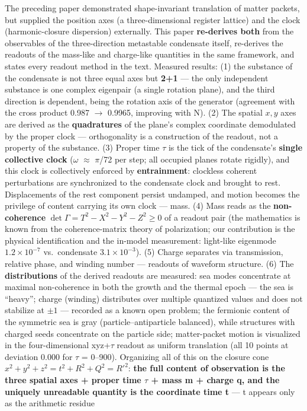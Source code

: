 \documentclass[
  a4paper,
]{article}
\begin{document}
The preceding paper demonstrated shape-invariant translation of matter
packets, but supplied the position axes (a three-dimensional register
lattice) and the clock (harmonic-closure dispersion) externally. This
paper \textbf{re-derives both} from the observables of the
three-direction metastable condensate itself, re-derives the readouts of
the mass-like and charge-like quantities in the same framework, and
states every readout method in the text. Measured results: (1) the
substance of the condensate is not three equal axes but \textbf{2+1} ---
the only independent substance is one complex eigenpair (a single
rotation plane), and the third direction is dependent, being the
rotation axis of the generator (agreement with the cross product 0.987
\(\to\) 0.9965, improving with N). (2) The spatial \(x, y\) axes are
derived as the \textbf{quadratures} of the plane's complex coordinate
demodulated by the proper clock --- orthogonality is a construction of
the readout, not a property of the substance. (3) Proper time \(\tau\)
is the tick of the condensate's \textbf{single collective clock}
(\(\omega\) \(\approx\) \(\pi\)/72 per step; all occupied planes rotate
rigidly), and this clock is collectively enforced by
\textbf{entrainment}: clockless coherent perturbations are synchronized
to the condensate clock and brought to rest. Displacements of the rest
component persist undamped, and motion becomes the privilege of content
carrying its own clock --- mass. (4) Mass reads as the
\textbf{non-coherence}
\(\det\Gamma = T^2\!-\!X^2\!-\!Y^2\!-\!Z^2 \ge 0\) of a readout pair
(the mathematics is known from the coherence-matrix theory of
polarization; our contribution is the physical identification and the
in-model measurement: light-like eigenmode \(1.2\times10^{-7}\)
vs.~condensate \(3.1\times10^{-3}\)). (5) Charge separates via
transmission, relative phase, and winding number --- readouts of
waveform structure. (6) The \textbf{distributions} of the derived
readouts are measured: sea modes concentrate at maximal non-coherence in
both the growth and the thermal epoch --- the sea is ``heavy''; charge
(winding) distributes over multiple quantized values and does not
stabilize at \(\pm 1\) --- recorded as a known open problem; the
fermionic content of the symmetric sea is gray (particle--antiparticle
balanced), while structures with charged seeds concentrate on the
particle side; matter-packet motion is visualized in the
four-dimensional xyz+\(\tau\) readout as uniform translation (all 10
points at deviation 0.000 for \(\tau\) = 0--900). Organizing all of this
on the closure cone \(x^2+y^2+z^2 = t^2+R^2+Q^2 = R'^2\): \textbf{the
full content of observation is the three spatial axes + proper time
\(\tau\) + mass m + charge q, and the uniquely unreadable quantity is
the coordinate time t} --- t appears only as the arithmetic residue
\end{document}
